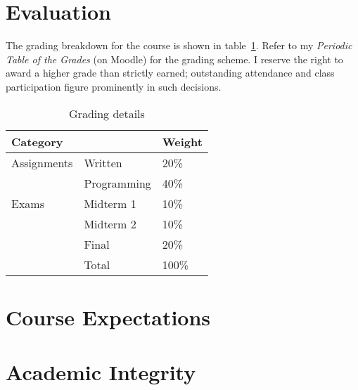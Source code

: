\documentclass[11pt]{article}
\begin{document}

\section{Evaluation}

The grading breakdown for the course
is shown in table~\ref{tab:grading}.
Refer to my \emph{Periodic Table of the Grades} (on Moodle)
for the grading scheme.
I reserve the right to award a higher grade than strictly earned;
outstanding attendance and class participation
figure prominently in such decisions.

\begin{table}[htb]
  \centering
  \begin{tabular}{lll}
    \toprule
    Category    &             & Weight \\
    \midrule
    Assignments & Written     & 20\%   \\
                & Programming & 40\%   \\
    Exams       & Midterm 1   & 10\%   \\
                & Midterm 2   & 10\%   \\
                & Final       & 20\%   \\
    \midrule
                & Total       & 100\%  \\
    \bottomrule
  \end{tabular}
  \caption{Grading details}
  \label{tab:grading}
\end{table}
\begin{comment}
  #+ORGTBL: SEND grades orgtbl-to-latex :splice nil :skip 0 :booktabs t
  | Category    |             | Weight |
  |-------------+-------------+--------|
  | Assignments | Written     |    20%
  |             | Programming |    40%
  | Exams       | Midterm 1   |    10%
  |             | Midterm 2   |    10%
  |             | Final       |    20%
  |-------------+-------------+--------|
  |             | Total       |   100%
  #+TBLFM: @7$3=100*vsum(@I..II);%
\end{comment}

\section{Course Expectations}



\section{Academic Integrity}



\printbibliography{}\label{sec:references}
\end{document}
